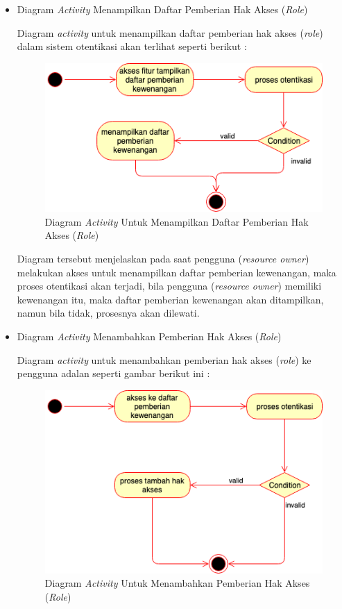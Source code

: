 \documentclass[pdftex,12pt, oneside]{article}
\begin{document}
\begin{itemize}
	\item Diagram \textit{Activity} Menampilkan Daftar Pemberian Hak Akses (\textit{Role})
	
	Diagram \textit{activity} untuk menampilkan daftar pemberian hak akses (\textit{role}) dalam sistem otentikasi akan terlihat seperti berikut :
	
	\begin{figure}[H]
		\centering
		\includegraphics[width=1\textwidth]{./resources/act-dia-list-user-role}
		\caption{Diagram \textit{Activity} Untuk Menampilkan Daftar Pemberian Hak Akses (\textit{Role})}
		\label{fig:act-dia-list-user-role}
	\end{figure}
	
	Diagram tersebut menjelaskan pada saat pengguna (\textit{resource owner}) melakukan akses untuk menampilkan daftar pemberian kewenangan, maka proses otentikasi akan terjadi, bila pengguna (\textit{resource owner}) memiliki kewenangan itu, maka daftar pemberian kewenangan akan ditampilkan, namun bila tidak, prosesnya akan dilewati.
	
	\item Diagram \textit{Activity} Menambahkan Pemberian Hak Akses (\textit{Role})
	
	Diagram \textit{activity} untuk menambahkan pemberian hak akses (\textit{role}) ke pengguna adalan seperti gambar berikut ini :
	
	\begin{figure}[H]
		\centering
		\includegraphics[width=1\textwidth]{./resources/act-dia-add-user-role}
		\caption{Diagram \textit{Activity} Untuk Menambahkan Pemberian Hak Akses (\textit{Role})}
		\label{fig:act-dia-add-user-role}
	\end{figure}	
	

\end{itemize}
\end{document}
